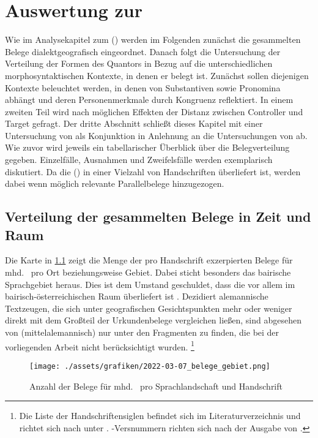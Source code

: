 \chapter{Auswertung zur }
\label{ch:kcanalyse}

Wie im Analysekapitel zum  (\CAO{}) werden im
Folgenden zunächst die gesammelten Belege dialektgeografisch eingeordnet.
Danach folgt die Untersuchung der Verteilung der Formen des Quantors
 in Bezug auf die unterschiedlichen morphosyntaktischen Kontexte,
in denen er belegt ist. Zunächst sollen diejenigen Kontexte beleuchtet werden,
in denen  von Substantiven sowie Pronomina abhängt und deren
Personenmerkmale durch Kongruenz reflektiert. In einem zweiten Teil wird nach
möglichen Effekten der Distanz zwischen Controller und Target gefragt. Der
dritte Abschnitt schließt dieses Kapitel mit einer Untersuchung von
 als Konjunktion in Anlehnung an die Untersuchungen von
\citet{askedal1974,gjelsten1980} ab. Wie zuvor wird jeweils ein tabellarischer
Überblick über die Belegverteilung gegeben. Einzelfälle, Ausnahmen und
Zweifelsfälle werden exemplarisch diskutiert. Da die \KC{}
(\KC{}) in einer Vielzahl von Handschriften überliefert ist, werden dabei
wenn möglich relevante Parallelbelege hinzugezogen.

\section{Verteilung der gesammelten Belege in Zeit und Raum}
\label{subsec:beiddispmap}

Die Karte in \cref{fig:kartebelegzahl} zeigt die Menge der pro Handschrift
exzerpierten Belege für mhd.\  pro Ort beziehungsweise Gebiet. Dabei
sticht besonders das bairische Sprachgebiet heraus. Dies ist dem Umstand
geschuldet, dass die \KC{} vor allem im bairisch-österreichischen Raum
überliefert ist \autocite{klein1988}. Dezidiert alemannische Textzeugen, die
sich unter geografischen Gesichtspunkten mehr oder weniger direkt mit dem
Großteil der Urkundenbelege vergleichen ließen, sind abgesehen von \citet{kc:K}
(mittelalemannisch) nur unter den Fragmenten zu finden, die bei der
vorliegenden Arbeit nicht berücksichtigt wurden.%
%
	\footnote{Die Liste der Handschriftensiglen befindet sich im
		Literaturverzeichnis und richtet sich nach  unter
		. \KC{}-Versnummern richten sich nach der
		Ausgabe von \nosh\citet{schroeder1895}.%
	}

\begin{figure}
\centering
\texttt{[image: ./assets/grafiken/2022-03-07\_belege\_gebiet.png]}
\caption[Anzahl der Belege für mhd.\  pro Sprachlandschaft und
Handschrift]{Anzahl der Belege für mhd.\  pro Sprachlandschaft
und Handschrift\nocite{wiesinger1983:rede}}
\label{fig:kartebelegzahl}
\end{figure}

